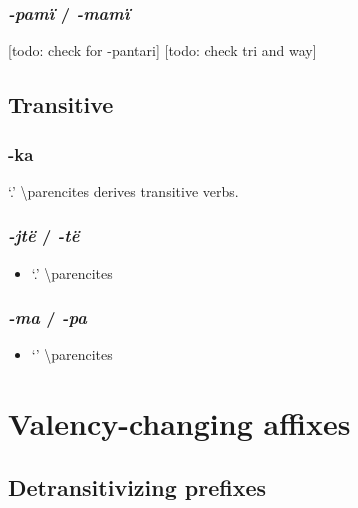 \documentclass{memoir}
\begin{document}
\subsubsection{\texorpdfstring{\emph{-pamï} /
\emph{-mamï}}{-pamï / -mamï}}

{[}todo: check for -pantari{]} {[}todo: check tri and way{]}

\subsection{Transitive}

\subsubsection{\texorpdfstring{-ka \label{sec:kavbz}}{-ka }}

 `.' \textbackslash parencites derives
transitive verbs.

\subsubsection{\texorpdfstring{\emph{-jtë} / \emph{-të}
\label{sec:jtevbz}}{-jtë / -të }}

\begin{itemize}
\tightlist
\item
   `.' \textbackslash parencites
\end{itemize}

\subsubsection{\texorpdfstring{\emph{-ma} / \emph{-pa}
\label{sec:macaus}}{-ma / -pa }}

\begin{itemize}
\tightlist
\item
   `' \textbackslash parencites
\end{itemize}

\section{Valency-changing affixes}

\subsection{\texorpdfstring{Detransitivizing prefixes
\label{sec:detrz}}{Detransitivizing prefixes }}
\end{document}
